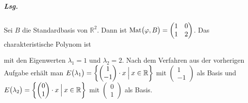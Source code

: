 \documentclass{scrreprt}
\begin{document}
\begin{enumerate}[(i)]
  \subparagraph{Lsg.} Sei $B$ die Standardbasis von $\mathbb{R}^2$.
  Dann ist
  $\text{Mat}\qty\big(\varphi, B) = \begin{pmatrix}1&0\\1&2\end{pmatrix}$.
  Das charakteristische Polynom ist
  mit den Eigenwerten $\lambda_1 = 1$ und $\lambda_2 = 2$.
  Nach dem Verfahren aus der vorherigen Aufgabe erhält man
  $E\qty\big(\lambda_1) = \qty{
    \begin{pmatrix}
      1 \\
      -1 \\
    \end{pmatrix} \cdot x
    \:{\Big |}\:
    x \in \mathbb{R}
  }$ mit $\begin{pmatrix}1\\-1\end{pmatrix}$ als Basis und
  $E\qty\big(\lambda_2) = \qty{
    \begin{pmatrix}
      0 \\
      1 \\
    \end{pmatrix} \cdot x
    \:{\Big |}\:
    x \in \mathbb{R}
  }$ mit $\begin{pmatrix}0\\1\end{pmatrix}$ als Basis.
\end{enumerate}
\end{document}
